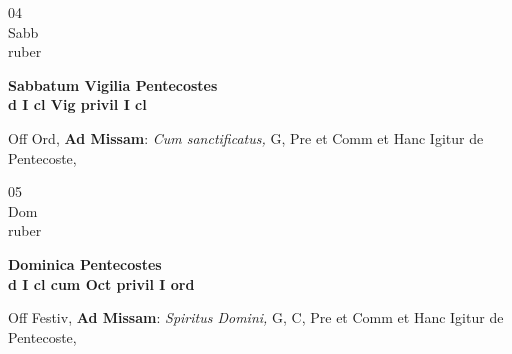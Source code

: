 \documentclass[10pt, openany]{book}
\begin{document}
        \begin{center}
            \begin{minipage}{3.5in}
                \vspace{2em}
                \begin{minipage}{0.5in}
                    {\Huge 04} \\
                    {\normalsize Sabb} \\
                    {\normalsize ruber}
                \end{minipage}
                \begin{minipage}{3.0in}
                    \textbf{ \large Sabbatum Vigilia Pentecostes \\
                    \textnormal{\normalsize d I cl Vig privil I cl}} \\ 
                \end{minipage}
                \begin{justify}Off Ord, \textbf{Ad Missam}: \textit{Cum sanctificatus,} G, Pre et Comm et Hanc Igitur de Pentecoste,  
                \end{justify}
            \end{minipage}
        \end{center}
    
        \begin{center}
            \begin{minipage}{3.5in}
                \vspace{2em}
                \begin{minipage}{0.5in}
                    {\Huge 05} \\
                    {\normalsize Dom} \\
                    {\normalsize ruber}
                \end{minipage}
                \begin{minipage}{3.0in}
                    \textbf{ \large Dominica Pentecostes \\
                    \textnormal{\normalsize d I cl cum Oct privil I ord}} \\ 
                \end{minipage}
                \begin{justify}Off Festiv, \textbf{Ad Missam}: \textit{Spiritus Domini,} G, C, Pre et Comm et Hanc Igitur de Pentecoste,  
                \end{justify}
            \end{minipage}
        \end{center}
    
\end{document}
